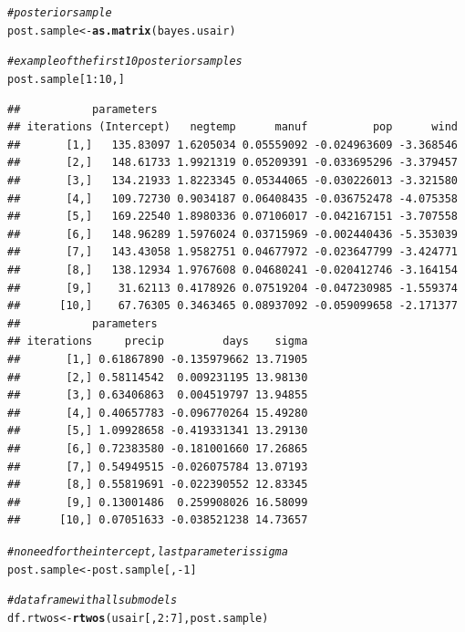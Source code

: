 \documentclass[11pt,a4paper,twoside]{book}\usepackage[]{graphicx}\usepackage[]{color}
\makeatletter
\newcommand{\hlnum}[1]{\textcolor[rgb]{0.686,0.059,0.569}{#1}}%
\newcommand{\hlcom}[1]{\textcolor[rgb]{0.678,0.584,0.686}{\textit{#1}}}%
\newcommand{\hlopt}[1]{\textcolor[rgb]{0,0,0}{#1}}%
\newcommand{\hlstd}[1]{\textcolor[rgb]{0.345,0.345,0.345}{#1}}%
\newcommand{\hlkwb}[1]{\textcolor[rgb]{0.69,0.353,0.396}{#1}}%
\newcommand{\hlkwd}[1]{\textcolor[rgb]{0.737,0.353,0.396}{\textbf{#1}}}%
\newenvironment{kframe}{%
 \def\at@end@of@kframe{}%
 \ifinner\ifhmode%
  \def\at@end@of@kframe{\end{minipage}}%
  \begin{minipage}{\columnwidth}%
 \fi\fi%
 \def\FrameCommand##1{\hskip\@totalleftmargin \hskip-\fboxsep
 \colorbox{shadecolor}{##1}\hskip-\fboxsep
     \hskip-\linewidth \hskip-\@totalleftmargin \hskip\columnwidth}%
 \MakeFramed {\advance\hsize-\width
   \@totalleftmargin\z@ \linewidth\hsize
   \@setminipage}}%
 {\par\unskip\endMakeFramed%
 \at@end@of@kframe}
\newenvironment{knitrout}{}{} %
\makeatother
\begin{document}
\begin{knitrout}
\begin{kframe}
\begin{alltt}
\hlcom{#posterior sample}
\hlstd{post.sample} \hlkwb{<-} \hlkwd{as.matrix}\hlstd{(bayes.usair)}

\hlcom{#example of the first 10 posterior samples}
\hlstd{post.sample[}\hlnum{1}\hlopt{:}\hlnum{10}\hlstd{,]}
\end{alltt}
\begin{verbatim}
##           parameters
## iterations (Intercept)   negtemp      manuf          pop      wind
##       [1,]   135.83097 1.6205034 0.05559092 -0.024963609 -3.368546
##       [2,]   148.61733 1.9921319 0.05209391 -0.033695296 -3.379457
##       [3,]   134.21933 1.8223345 0.05344065 -0.030226013 -3.321580
##       [4,]   109.72730 0.9034187 0.06408435 -0.036752478 -4.075358
##       [5,]   169.22540 1.8980336 0.07106017 -0.042167151 -3.707558
##       [6,]   148.96289 1.5976024 0.03715969 -0.002440436 -5.353039
##       [7,]   143.43058 1.9582751 0.04677972 -0.023647799 -3.424771
##       [8,]   138.12934 1.9767608 0.04680241 -0.020412746 -3.164154
##       [9,]    31.62113 0.4178926 0.07519204 -0.047230985 -1.559374
##      [10,]    67.76305 0.3463465 0.08937092 -0.059099658 -2.171377
##           parameters
## iterations     precip         days    sigma
##       [1,] 0.61867890 -0.135979662 13.71905
##       [2,] 0.58114542  0.009231195 13.98130
##       [3,] 0.63406863  0.004519797 13.94855
##       [4,] 0.40657783 -0.096770264 15.49280
##       [5,] 1.09928658 -0.419331341 13.29130
##       [6,] 0.72383580 -0.181001660 17.26865
##       [7,] 0.54949515 -0.026075784 13.07193
##       [8,] 0.55819691 -0.022390552 12.83345
##       [9,] 0.13001486  0.259908026 16.58099
##      [10,] 0.07051633 -0.038521238 14.73657
\end{verbatim}
\begin{alltt}
\hlcom{#no need for the intercept, last parameter is sigma}
\hlstd{post.sample} \hlkwb{<-} \hlstd{post.sample[,}\hlopt{-}\hlnum{1}\hlstd{]}

\hlcom{#data frame with all submodels}
\hlstd{df.rtwos} \hlkwb{<-}\hlkwd{rtwos}\hlstd{(usair[,}\hlnum{2}\hlopt{:}\hlnum{7}\hlstd{], post.sample)}


\end{alltt}
\end{kframe}
\end{knitrout}
\end{document}
